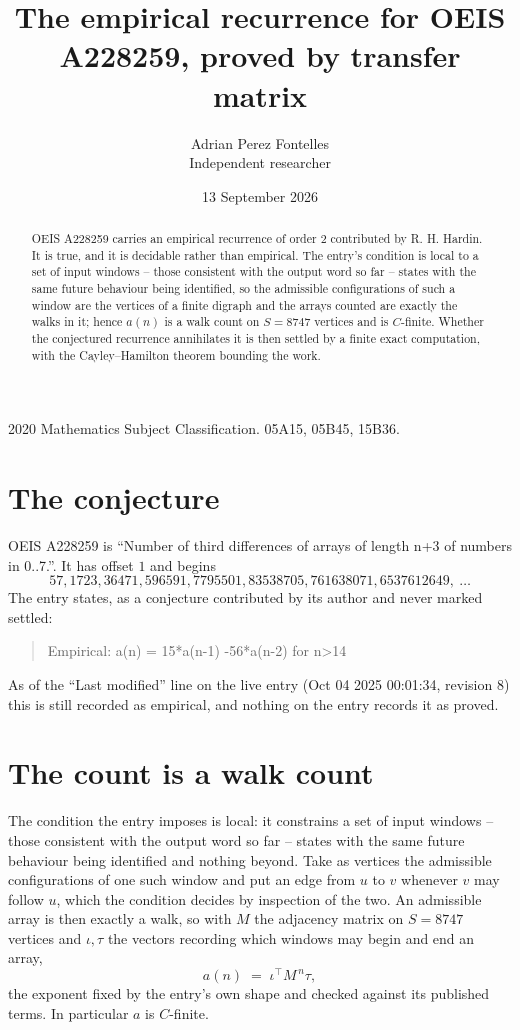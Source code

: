 \documentclass[11pt,a4paper]{article}
\title{The empirical recurrence for OEIS A228259, proved by transfer matrix}
\author{Adrian Perez Fontelles\\ \small Independent researcher}
\date{13 September 2026}
\theoremstyle{plain}
\theoremstyle{definition}
\begin{document}
\maketitle

\begin{abstract}
OEIS A228259 carries an empirical recurrence of order $2$ contributed by R. H. Hardin. It is
true, and it is decidable rather than empirical. The entry's condition is local to a set of input windows -- those consistent with the output word so far -- states with the same future behaviour being identified, so
the admissible configurations of such a window are the vertices of a finite digraph and the
arrays counted are exactly the walks in it; hence $a(n)$ is a walk count on $S=8747$ vertices
and is $C$-finite. Whether the conjectured recurrence annihilates it is then settled by a
finite exact computation, with the Cayley--Hamilton theorem bounding the work.
\end{abstract}

\noindent\small 2020 Mathematics Subject Classification. 05A15, 05B45, 15B36.\normalsize

\section{The conjecture}

OEIS A228259 is ``Number of third differences of arrays of length n+3 of numbers in 0..7.''. It has offset $1$ and begins
\[
57, 1723, 36471, 596591, 7795501, 83538705, 761638071, 6537612649,\ \dots
\]
The entry states, as a conjecture contributed by its author and never marked settled:
\begin{quote}
Empirical: a(n) = 15*a(n-1) -56*a(n-2) for n>14
\end{quote}
As of the ``Last modified'' line on the live entry (Oct 04 2025 00:01:34, revision 8) this is still
recorded as empirical, and nothing on the entry records it as proved.

\section{The count is a walk count}

The condition the entry imposes is local: it constrains a set of input windows -- those consistent with the output word so far -- states with the same future behaviour being identified and nothing beyond. Take as
vertices the admissible configurations of one such window and put an edge from $u$ to $v$
whenever $v$ may follow $u$, which the condition decides by inspection of the two. An
admissible array is then exactly a walk, so with $M$ the adjacency matrix on $S=8747$ vertices
and $\iota,\tau$ the vectors recording which windows may begin and end an array,
\[
a(n)\;=\;\iota^{\!\top}M^{\,n}\tau ,
\]
the exponent fixed by the entry's own shape and checked against its published terms. In
particular $a$ is $C$-finite.
\end{document}
